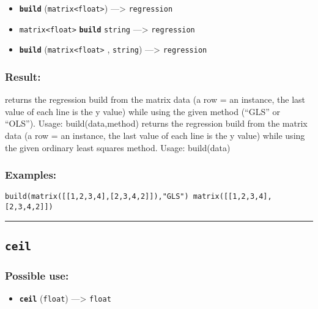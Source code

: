\documentclass[]{book}
\providecommand{\tightlist}{%
  \setlength{\itemsep}{0pt}\setlength{\parskip}{0pt}}
\theoremstyle{definition}
\theoremstyle{definition}
\theoremstyle{definition}
\theoremstyle{remark}
\begin{document}
\begin{itemize}
\tightlist
\item
  \textbf{\texttt{build}}
  (\texttt{matrix\textless{}float\textgreater{}}) ---\textgreater{}
  \texttt{regression}
\item
  \texttt{matrix\textless{}float\textgreater{}} \textbf{\texttt{build}}
  \texttt{string} ---\textgreater{} \texttt{regression}
\item
  \textbf{\texttt{build}} (\texttt{matrix\textless{}float\textgreater{}}
  , \texttt{string}) ---\textgreater{} \texttt{regression}
\end{itemize}

\subsubsection{Result:}\label{result-78}

returns the regression build from the matrix data (a row = an instance,
the last value of each line is the y value) while using the given method
(``GLS'' or ``OLS''). Usage: build(data,method) returns the regression
build from the matrix data (a row = an instance, the last value of each
line is the y value) while using the given ordinary least squares
method. Usage: build(data)

\subsubsection{Examples:}\label{examples-61}

\begin{verbatim}
build(matrix([[1,2,3,4],[2,3,4,2]]),"GLS") matrix([[1,2,3,4],[2,3,4,2]]) 
\end{verbatim}

\begin{center}\rule{0.5\linewidth}{\linethickness}\end{center}

\subsection{\texorpdfstring{\texttt{ceil}}{ceil}}\label{ceil}

\subsubsection{Possible use:}\label{possible-use-80}

\begin{itemize}
\tightlist
\item
  \textbf{\texttt{ceil}} (\texttt{float}) ---\textgreater{}
  \texttt{float}
\end{itemize}
\end{document}
